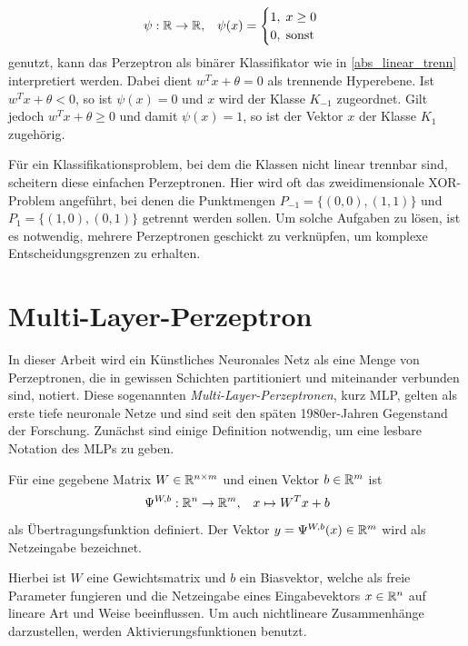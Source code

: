 \begin{equation*}
    \psi: \mathbb{R} \rightarrow \mathbb{R}, \; \; \;
    \psi(x)=\begin{cases}
       1 , \; x \geq 0 \\
       0 , \; \text{sonst}
    \end{cases}
\end{equation*} 
genutzt, kann das Perzeptron als binärer Klassifikator wie in \ref{abs_linear_trenn} interpretiert werden. Dabei dient $w^Tx+\theta=0$ als trennende Hyperebene. Ist $w^Tx+\theta<0$, so ist $\psi(x)=0$ und $x$ wird der Klasse $K_{-1}$ zugeordnet. Gilt jedoch $w^Tx+\theta \geq 0$ und damit $\psi(x)=1$, so ist der Vektor $x$ der Klasse $K_1$ zugehörig. 

Für ein Klassifikationsproblem, bei dem die Klassen nicht linear trennbar sind, scheitern diese einfachen Perzeptronen. Hier wird oft das zweidimensionale XOR-Problem angeführt, bei denen die Punktmengen $P_{-1}=\{(0,0),(1,1)\}$ und $P_{1}=\{(1,0),(0,1)\}$ getrennt werden sollen. Um solche Aufgaben zu lösen, ist es notwendig, mehrere Perzeptronen geschickt zu verknüpfen, um komplexe Entscheidungsgrenzen zu erhalten.

\section{Multi-Layer-Perzeptron}
\label{MLP_abs}
In dieser Arbeit wird ein Künstliches Neuronales Netz als eine Menge von Perzeptronen, die in gewissen Schichten partitioniert und miteinander verbunden sind, notiert. Diese sogenannten \textit{Multi-Layer-Perzeptronen}, kurz MLP,  gelten als erste tiefe neuronale Netze und sind seit den späten 1980er-Jahren Gegenstand der Forschung\cite{bourlard1990links,bounds1988multilayer,MLPbook}. Zunächst sind einige Definition notwendig, um eine lesbare Notation des MLPs zu geben.

\begin{defi}[Übertragungsfunktion]
    \label{def_net}
    Für eine gegebene Matrix $W \in \mathbb{R}^{n \times m}$ und einen Vektor $b \in \mathbb{R}^m$ ist 
    \[ 
    \Psi^{W,b}: \mathbb{R}^n \rightarrow \mathbb{R}^m, \; \; \; x \mapsto W^T x +b
    \]
    als Übertragungsfunktion definiert. Der Vektor $y=\Psi^{W,b}(x) \in \mathbb{R}^m $ wird als Netzeingabe bezeichnet.
\end{defi}
Hierbei ist $W$ eine Gewichtsmatrix und $b$ ein Biasvektor, welche als freie Parameter fungieren und die Netzeingabe eines Eingabevektors $x \in \mathbb{R}^n$ auf lineare Art und Weise beeinflussen. Um auch nichtlineare Zusammenhänge darzustellen, werden Aktivierungsfunktionen benutzt.


